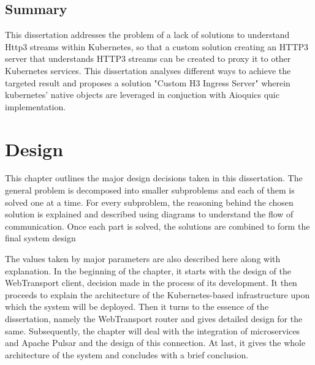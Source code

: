 \section{Summary}
This dissertation addresses the problem of a lack of solutions to understand Http3 streams within Kubernetes, so that a custom solution creating an HTTP3 server that understands HTTP3 streams can be created to proxy it to other Kubernetes services. This dissertation analyses different ways to achieve the targeted result and proposes a solution "Custom H3 Ingress Server" wherein kubernetes' native objects are leveraged in conjuction with Aioquics quic implementation.


\chapter{Design}
\label{chap:Design}




This chapter outlines the major design decisions taken in this dissertation. The general problem is decomposed into smaller subproblems and each of them is solved one at a time. For every subproblem, the reasoning behind the chosen solution is explained and described using diagrams to understand the flow of communication. Once each part is solved, the solutions are combined to form the final system design

The values taken by major parameters are also described here along with explanation. In the beginning of the chapter, it starts with the design of the WebTransport client, decision made in the process of its development. It then proceeds to explain the architecture of the Kubernetes-based infrastructure upon which the system will be deployed. Then it turns to the essence of the dissertation, namely the WebTransport router and gives detailed design for the same. Subsequently, the chapter will deal with the integration of microservices and Apache Pulsar and the design of this connection. At last, it gives the whole architecture of the system and concludes with a brief conclusion.



